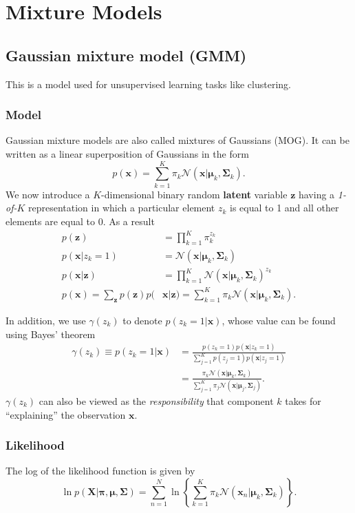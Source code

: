 \documentclass[a4paper]{book}
\renewcommand{\bf}{\mathbf}
\renewcommand{\cal}{\mathcal}
\newcommand{\imp}[1]{\textit{#1}}
\newcommand{\bs}{\boldsymbol}
\begin{document}
\section{Mixture Models}
\subsection{Gaussian mixture model (GMM)}
This is a model used for unsupervised learning tasks like clustering.
\subsubsection{Model}
Gaussian mixture models are also called mixtures of Gaussians (MOG). It can be written as a linear superposition of Gaussians in the form
\begin{equation}
	p(\bf{x}) = \sum_{k=1}^K \pi_k \cal{N}(\bf{x}|\bs{\mu}_k,\bs{\Sigma}_k).
\end{equation}
We now introduce a $K$-dimensional binary random \textbf{latent} variable $\bf{z}$ having a \imp{1-of-$K$} representation in which a particular element $z_k$ is equal to 1 and all other elements are equal to 0. As a result
\begin{align}
 p(\bf{z}) &= \prod_{k=1}^{K} \pi_k^{z_k} \\
 p(\bf{x}|z_k=1) &= \cal{N}(\bf{x}|\bs{\mu}_k,\bs{\Sigma}_k) \\
 p(\bf{x|z})&= \prod_{k=1}^K \cal{N}(\bf{x}|\bs{\mu}_k,\bs{\Sigma}_k)^{z_k}\\
 p(\bf{x}) = \sum_{\bf{z}} p(\bf{z})p(&\bf{x|z}) = \sum_{k=1}^K \pi_k \cal{N}(\bf{x}|\bs{\mu}_k,\bs{\Sigma}_k).
\end{align}

In addition, we use $\gamma(z_k)$ to denote $p(z_k=1|\bf{x})$, whose value can be found using Bayes' theorem
\begin{align}
	\gamma(z_k)\equiv p(z_k=1|\bf{x}) &= \frac{p(z_k=1)p(\bf{x}|z_k=1)}{\sum_{j=1}^K p(z_j=1)p(\bf{x}|z_j=1)} \\
	&= \frac{\pi_k \cal{N}(\bf{x}|\bs{\mu}_k,\bs{\Sigma}_k)}{\sum_{j=1}^K \pi_j \cal{N}(\bf{x}|\bs{\mu}_j,\bs{\Sigma}_j)}.
\end{align}
$\gamma(z_k)$ can also be viewed as the \imp{responsibility} that component $k$ takes for ``explaining'' the observation $\bf{x}$.
\subsubsection{Likelihood}
The log of the likelihood function is given by
\begin{equation}
	\ln p(\bf{X}|\bs{\pi,\mu,\Sigma}) = \sum_{n=1}^N \ln \left\{ \sum_{k=1}^K \pi_k \cal{N}(\bf{x}_n|\bs{\mu}_k,\bs{\Sigma}_k) \right\}.
\end{equation}
\end{document}
